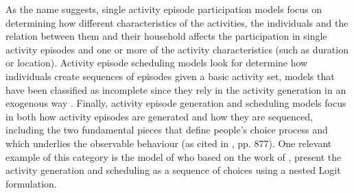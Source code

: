 \documentclass[Journal,letterpaper]{ascelike-new}
\begin{document}
As the name suggests, single activity episode participation models focus on determining how different characteristics of the activities, the individuals and the relation between them and their household affects the participation in single activity episodes and one or more of the activity characteristics (such as duration or location). Activity episode scheduling models look for determine how individuals create sequences of episodes given a basic activity set, models that have been classified as incomplete since they rely in the activity generation in an exogenous way \citep{bowman2009historical}. Finally, activity episode generation and scheduling models focus in both how activity episodes are generated and how they are sequenced, including the two fundamental pieces that define people's choice process and which underlies the observable behaviour (as cited in \cite{Scott2002875}, pp. 877). One relevant example of this category is the model of \cite{Bowman20011} who based on the work of \cite{Mosh-1996}, present the activity generation and scheduling as a sequence of choices using a nested Logit formulation.

\end{document}
